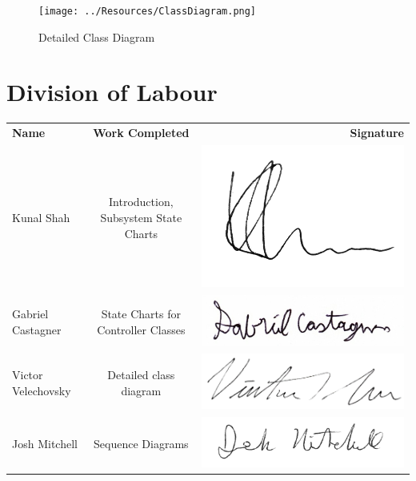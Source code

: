 \documentclass[]{article}
\begin{document}
\begin{figure}[H]
	\texttt{[image: ../Resources/ClassDiagram.png]}
	\caption{Detailed Class Diagram}
\end{figure}

\newpage

\appendix
\section{Division of Labour}
\label{sec:division_of_labour}
\begin{tabular}{l c r}
	\textbf{Name} & \textbf{Work Completed} & \textbf{Signature} \\
	
	Kunal Shah & Introduction, Subsystem State Charts  & 
	\includegraphics[scale=0.2]{../Resources/Signature/Kunal-Sig.png} \\
	
	Gabriel Castagner & State Charts for Controller Classes &
	\includegraphics[scale=0.2]{../Resources/Signature/Gabe-Sig.png} \\
	
	Victor Velechovsky & Detailed class diagram & 
	\includegraphics[scale=0.3]{../Resources/Signature/Vic-Sig.png} \\
	
	Josh Mitchell & Sequence Diagrams & 
	\includegraphics[scale=0.2]{../Resources/Signature/Josh-Sig.png} \\
\end{tabular}
\end{document}
